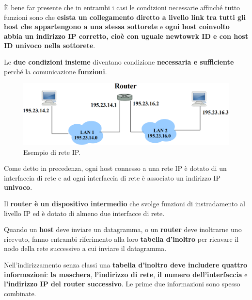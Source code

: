 \documentclass[11pt,a4paper,oneside]{book}
\theoremstyle{definition}
\begin{document}
È bene far presente che in entrambi i casi le condizioni necessarie affinché tutto funzioni sono che \textbf{esista un collegamento diretto a livello link tra tutti gli host che appartengono a una stessa sottorete} e \textbf{ogni host coinvolto abbia un indirizzo IP corretto, cioè con uguale newtowrk ID  e con host ID univoco nella sottorete}.

Le \textbf{due condizioni insieme} diventano condizione \textbf{necessaria e sufficiente} perché la comunicazione \textbf{funzioni}.

\begin{figure}[!h]
	\includegraphics[scale=0.35]{Immagini/Ip_net.png}
	\centering
	\caption{Esempio di rete IP.}
\end{figure}

Come detto in precedenza, ogni host connesso a una rete IP è dotato di un interfaccia di rete e ad ogni interfaccia di rete è associato un indirizzo IP \textbf{univoco}.

Il \textbf{router è un dispositivo intermedio} che svolge funzioni di instradamento al livello IP ed è dotato di almeno due interfacce di rete.

Quando un \textbf{host} deve inviare un datagramma, o un \textbf{router} deve inoltrarne uno ricevuto, fanno entrambi riferimento alla loro \textbf{tabella d'inoltro} per ricavare il nodo della rete successivo a cui inviare il datagramma.

Nell'indirizzamento senza classi una \textbf{tabella d'inoltro deve includere quattro informazioni}: \textbf{la maschera}, \textbf{l'indirizzo di rete}, \textbf{il numero dell'interfaccia} e \textbf{l'indirizzo IP del router successivo}. Le prime due informazioni sono spesso combinate.

\pagebreak
\end{document}
